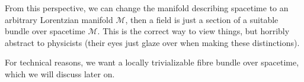 From this perspective, we can change the manifold describing spacetime
to an arbitrary Lorentzian manifold $\mathcal{M}$, then a field is just
a section of a suitable bundle over spacetime $\mathcal{M}$.
This is the correct way to view things, but horribly abstract to
physicists (their eyes just glaze over when making these distinctions).

For technical reasons, we want a locally trivializable fibre bundle over
spacetime, which we will discuss later on.
